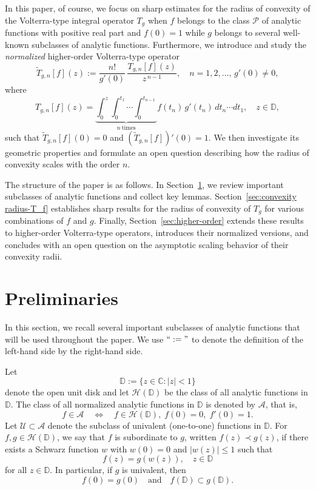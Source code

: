 \documentclass[12pt,a4paper]{amsart}
\numberwithin{equation}{section}
\theoremstyle{remark}
\begin{document}
In this paper, of course, we focus on sharp estimates for the radius of convexity of the Volterra-type integral operator $T_g$ when \(f\) belongs to the class
\(\mathcal{P}\) of analytic functions with positive real part and $f(0)=1$ while \(g\) belongs to several well-known
subclasses of analytic functions.
Furthermore, we introduce and study the \textit{normalized} higher-order Volterra-type operator
\begin{equation*}
\widetilde T_{g,n}[f](z)
:=\frac{n!}{g'(0)}\,
\frac{T_{g,n}[f](z)}{z^{\,n-1}},\quad n=1,2,\ldots,\, g'(0)\neq0,
\end{equation*}
where 
\begin{equation*}
T_{g,n}[f](z)
= \underbrace{\int_0^z \int_0^{t_1} \!\!\cdots \int_0^{t_{n-1}}}_{n\ \text{times}}
f(t_n)\, g'(t_n)\, dt_n \cdots dt_1,
\quad z\in\mathbb{D},
\end{equation*}
such that \(\widetilde{T}_{g,n}[f](0) =0\) and \((\widetilde{T}_{g,n}[f])'(0)=1.\)
We then investigate its geometric properties and formulate an open question
describing how the radius of convexity scales with the order \(n\).


The structure of the paper is as follows. 
In Section~\ref{sec:Subclass}, we review important subclasses of analytic functions and collect key lemmas. 
Section~\ref{sec:convexity radius-T_f} establishes sharp results for the radius of convexity of \(T_g\) for various combinations of \(f\) and \(g\). 
Finally, Section~\ref{sec:higher-order} extends these results to higher-order Volterra-type operators, introduces their normalized versions, and concludes with an open question on the asymptotic scaling behavior of their convexity radii.


\section{Preliminaries}\label{sec:Subclass}

In this section, we recall several important subclasses of analytic functions that will be used throughout the paper. We use $``:="$ to denote the definition of the left-hand side by the right-hand side.

Let 
\[
\mathbb{D} := \{ z \in \mathbb{C} : |z|<1 \}
\] 
denote the open unit disk and let $\mathcal{H}(\mathbb{D})$ be the class of all analytic functions in $\mathbb{D}$. The class of all normalized analytic functions in $\mathbb{D}$ is denoted by $\mathcal{A}$, that is,
\[
f \in \mathcal{A} \quad \Longleftrightarrow \quad f \in \mathcal{H}(\mathbb{D}), \; f(0)=0, \; f'(0)=1.
\]
Let $\mathcal{U} \subset \mathcal{A}$ denote the subclass of univalent (one-to-one) functions in $\mathbb{D}$.  
For $f,g \in \mathcal{H}(\mathbb{D})$, we say that $f$ is subordinate to $g$, written $f(z)\prec g(z)$, if there exists a Schwarz function $w$ with $w(0)=0$ and $|w(z)|\le 1$ such that
\[
f(z) = g(w(z)), \quad z \in \mathbb{D}
\]
for all $z\in\mathbb{D}$. 
In particular, if $g$ is univalent, then
\[
f(0) = g(0) \quad \text{and} \quad f(\mathbb{D}) \subset g(\mathbb{D}).
\]
\end{document}
